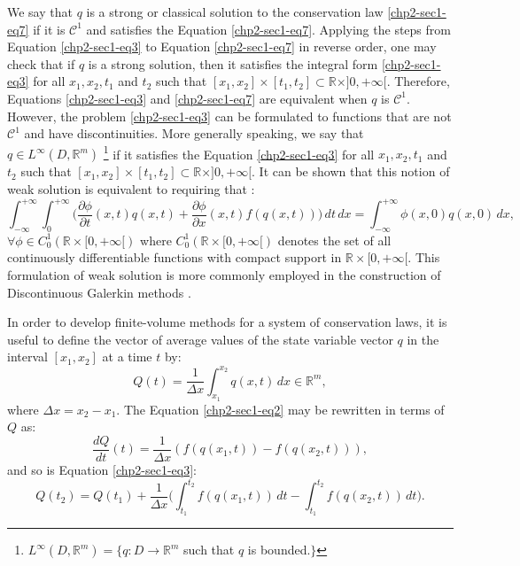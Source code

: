 We say that ${q}$ is a strong or classical solution to the conservation law \eqref{chp2-sec1-eq7}
if it is $\mathcal{C}^1$ and satisfies the Equation \eqref{chp2-sec1-eq7}.
Applying the steps from Equation \eqref{chp2-sec1-eq3} to Equation \eqref{chp2-sec1-eq7}
in reverse order, one may check that if ${q}$ is a strong solution,
then it satisfies the integral form \eqref{chp2-sec1-eq3} for all $x_1, x_2, t_1$ and $t_2$ such that
$[x_1, x_2] \times [t_1, t_2] \subset \mathbb{R}\times ]0, +\infty[$. 
Therefore, Equations \eqref{chp2-sec1-eq3} and \eqref{chp2-sec1-eq7} are
equivalent when ${q}$ is $\mathcal{C}^1$.
However, the problem \eqref{chp2-sec1-eq3} can be formulated
to functions that are not $\mathcal{C}^1$ and have discontinuities.
More generally speaking, we say that ${q} \in L^{\infty}(D, \mathbb{R}^m)$ 
\footnote{$L^{\infty}(D, \mathbb{R}^m) = \{q: D \to \mathbb{R}^m$
	such that $q$ is bounded.$\}$}
if it satisfies the Equation 
\eqref{chp2-sec1-eq3} for all $x_1, x_2, t_1$ and $t_2$ such that
$[x_1, x_2] \times [t_1, t_2] \subset \mathbb{R}\times ]0, +\infty[$.
It can be shown that this notion of weak solution is equivalent to requiring that \citep{leveque:1990}:
\begin{equation}
	\label{chp2-sec1-eq8}
	\int_{-\infty}^{+\infty} \int_{0}^{+\infty} \bigg(
	\frac{\partial \phi}{\partial t} (x, t){q}(x, t) +
	\frac{\partial \phi}{\partial x} (x ,t){f}({q}(x, t)) 
	\bigg)\,dt \,dx = 
	\int_{-\infty}^{+\infty} \phi(x, 0){q}(x, 0) \,dx  , \quad
\end{equation}
$\forall \phi \in C_{0}^{1}(\mathbb{R}\times[0, +\infty[)$
where $C_{0}^{1}(\mathbb{R}\times[0, +\infty[)$ denotes the set
of all continuously differentiable functions with compact support 
in $\mathbb{R}\times[0, +\infty[$. This formulation of weak solution
is more commonly employed in the construction of Discontinuous Galerkin
methods \citep{nair:2011}.

In order to develop finite-volume methods for a system of conservation laws, it is useful to define the vector of
average values of the state variable vector ${q}$ in the interval $[x_1, x_2]$ at a time $t$ by:
\begin{equation}
	\label{chp2-sec1-eq9}
	{Q}(t) = \frac{1}{\Delta x}
	\int_{x_1}^{x_2} {q}(x,t) \,dx
	\in \mathbb{R}^m,
\end{equation}
where $\Delta x = x_2 - x_1$. The Equation \eqref{chp2-sec1-eq2} may be  rewritten in terms of ${Q}$ as:
\begin{equation}
        \label{chp2-sec1-eq10}
	\frac{dQ}{dt} (t) = \frac{1}{\Delta x} 
	({f}({q}(x_1,t)) - {f}({q}(x_2,t))) ,
\end{equation}
and so is Equation \eqref{chp2-sec1-eq3}:
\begin{equation}
        \label{chp2-sec1-eq11}
	{Q}(t_2) =  {Q}(t_1) + 
	\frac{1}{\Delta x}\bigg( \int_{t_1}^{t_2} 
	{f}({q}(x_1, t)) \,dt - 
	\int_{t_1}^{t_2}{f}({q}(x_2, t)) \,dt \bigg).
\end{equation}

